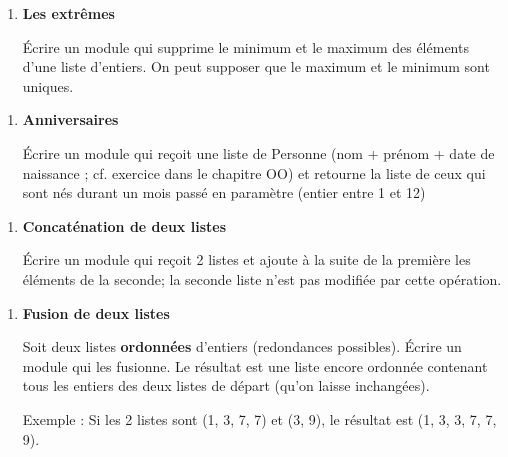 	\liststyleExercice
	\setcounter{saveenum}{\value{enumi}}
	\begin{enumerate}
	\setcounter{enumi}{\value{saveenum}}
		\item {\sffamily\bfseries
		Les extrêmes}
		
			Écrire un module qui supprime le minimum et le maximum des éléments
			d’une liste d’entiers. On peut supposer que le maximum et le minimum
			sont uniques.
	\end{enumerate}

	\liststyleExercice
	\setcounter{saveenum}{\value{enumi}}
	\begin{enumerate}
	\setcounter{enumi}{\value{saveenum}}
		\item {\sffamily\bfseries
		Anniversaires}
		
			Écrire un module qui reçoit une liste de Personne (nom + prénom + date
			de naissance ; cf. exercice dans le chapitre OO) et retourne la liste
			de ceux qui sont nés durant un mois passé en paramètre (entier entre 1
			et 12)
		\end{enumerate}
		
	\liststyleExercice
	\setcounter{saveenum}{\value{enumi}}
	\begin{enumerate}
	\setcounter{enumi}{\value{saveenum}}
		\item {\sffamily\bfseries
		Concaténation de deux listes}
		
			Écrire un module qui reçoit 2 listes et ajoute
			à la suite de la première les éléments de la seconde; la seconde liste
			n'est pas modifiée par cette opération.
	\end{enumerate}
	
	\liststyleExercice
	\setcounter{saveenum}{\value{enumi}}
	\begin{enumerate}
	\setcounter{enumi}{\value{saveenum}}
		\item {\sffamily\bfseries
		Fusion de deux listes}
		
			Soit deux listes \textbf{ordonnées}
			d'entiers (redondances possibles). Écrire un module
			qui les fusionne. Le résultat est une liste encore ordonnée contenant
			tous les entiers des deux listes de départ (qu'on
			laisse inchangées).

			Exemple : Si les 2 listes sont (1, 3, 7, 7) et (3, 9), 
			le résultat est (1, 3, 3, 7, 7, 9).
	\end{enumerate}
	
